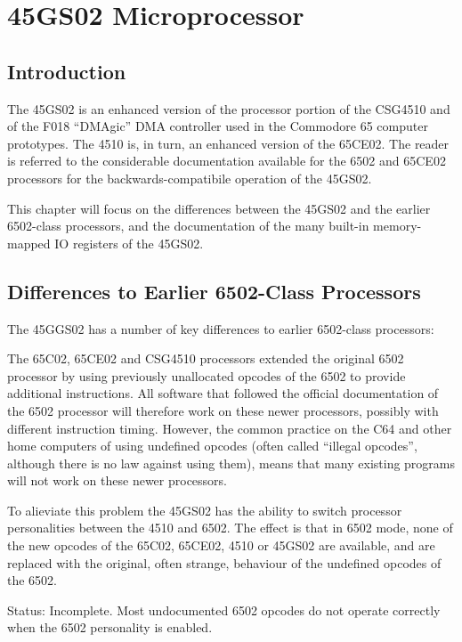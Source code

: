 \chapter{45GS02 Microprocessor}

\section{Introduction}

The 45GS02 is an enhanced version of the processor portion of the CSG4510
and of the F018 ``DMAgic'' DMA controller used in the Commodore 65 computer prototypes.  The 4510 is, in turn,
an enhanced version of the 65CE02.  
The reader is referred to
the considerable documentation available for the 6502 and 65CE02 processors
for the backwards-compatibile operation of the 45GS02.

This chapter will
focus on the differences between the 45GS02 and the earlier 6502-class
processors, and the documentation of the many built-in memory-mapped IO
registers of the 45GS02.

\section{Differences to Earlier 6502-Class Processors}

The 45GGS02 has a number of key differences to earlier 6502-class processors:


The 65C02, 65CE02 and CSG4510 processors extended the original 6502 processor
by using previously unallocated opcodes of the 6502 to provide additional
instructions.  All software that followed the official documentation of the 6502
processor will therefore work on these newer processors, possibly with different
instruction timing.  However, the common practice on the C64 and other home computers
of using undefined opcodes (often called ``illegal opcodes'', although there is no
law against using them), means that many existing programs will not work on these
newer processors.

To alieviate this problem the 45GS02 has the ability to switch processor personalities
between the 4510 and 6502.  The effect is that in 6502 mode, none of the new opcodes of
the 65C02, 65CE02, 4510 or 45GS02 are available, and are replaced with the original,
often strange, behaviour of the undefined opcodes of the 6502.

Status: Incomplete.  Most undocumented 6502 opcodes do not operate correctly when the 6502
personality is enabled.

